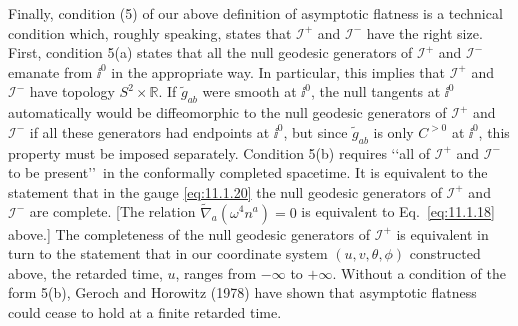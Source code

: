 Finally, condition (5) of our above definition of asymptotic flatness is a technical
condition which, roughly speaking, states that \(\mathcal I^+\) and \(\mathcal I^-\)
have the right size. First, condition 5(a) states that all the null geodesic generators
of \(\mathcal I^+\) and \(\mathcal I^-\) emanate from \(\ii^0\) in the appropriate way.
In particular, this implies that \(\mathcal I^+\) and \(\mathcal I^-\) have topology
\(S^2\times\mathbb R\). If \(\tilde g_{ab}\) were smooth at \(\ii^0\), the null tangents
at \(\ii^0\) automatically would be diffeomorphic to the null geodesic generators of
\(\mathcal I^+\) and \(\mathcal I^-\) if all these generators had endpoints at \(\ii^0\),
but since \(\tilde g_{ab}\) is only \(C^{>0}\) at \(\ii^0\), this property must be imposed
separately. Condition 5(b) requires \lq\lq all of \(\mathcal I^+\) and
\(\mathcal I^-\) to be present\rq\rq\ in the conformally completed spacetime. It is
equivalent to the statement that in the gauge \eqref{eq:11.1.20} the null geodesic
generators of \(\mathcal I^+\) and \(\mathcal I^-\) are complete. [The relation
\(\tilde\nabla_a(\omega^4n^a)=0\) is equivalent to Eq.~\eqref{eq:11.1.18} above.]
The completeness of the null geodesic generators of \(\mathcal I^+\) is equivalent in
turn to the statement that in our coordinate system \((u,v,\theta,\phi)\) constructed
above, the retarded time, \(u\), ranges from \(-\infty\) to \(+\infty\). Without a
condition of the form 5(b), Geroch and Horowitz (1978) have shown that asymptotic
flatness could cease to hold at a finite retarded time.

